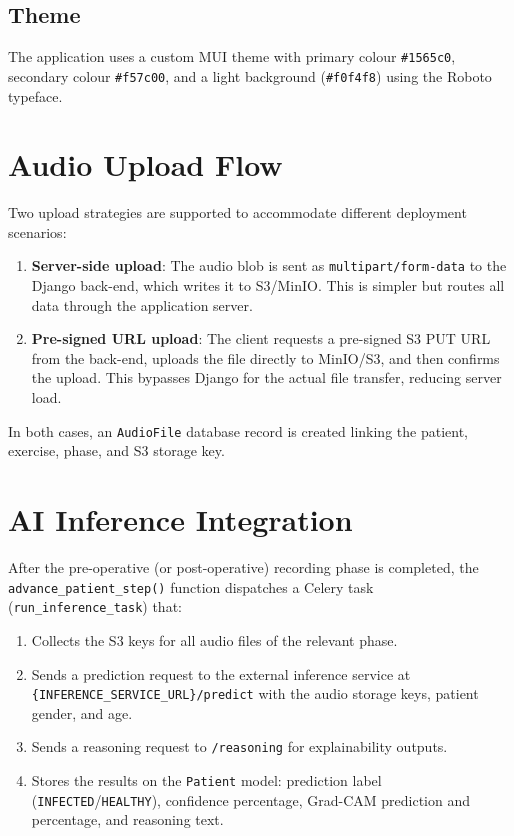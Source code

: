 \documentclass[12pt,a4paper]{article}
\begin{document}
\subsection{Theme}

The application uses a custom MUI theme with primary colour
\texttt{\#1565c0}, secondary colour \texttt{\#f57c00}, and a light background
(\texttt{\#f0f4f8}) using the Roboto typeface.

\section{Audio Upload Flow}
\label{sec:audio-upload}

Two upload strategies are supported to accommodate different deployment
scenarios:

\begin{enumerate}[nosep]
  \item \textbf{Server-side upload}: The audio blob is sent as
    \texttt{multipart/form-data} to the Django back-end, which writes it to
    S3/MinIO. This is simpler but routes all data through the application
    server.
  \item \textbf{Pre-signed URL upload}: The client requests a pre-signed S3 PUT
    URL from the back-end, uploads the file directly to MinIO/S3, and then
    confirms the upload. This bypasses Django for the actual file transfer,
    reducing server load.
\end{enumerate}

In both cases, an \texttt{AudioFile} database record is created linking the
patient, exercise, phase, and S3 storage key.

\section{AI Inference Integration}
\label{sec:inference}

After the pre-operative (or post-operative) recording phase is completed, the
\texttt{advance\_patient\_step()} function dispatches a Celery task
(\texttt{run\_inference\_task}) that:

\begin{enumerate}[nosep]
  \item Collects the S3 keys for all audio files of the relevant phase.
  \item Sends a prediction request to the external inference service at
    \texttt{\{INFERENCE\_SERVICE\_URL\}/predict} with the audio storage keys,
    patient gender, and age.
  \item Sends a reasoning request to \texttt{/reasoning} for explainability
    outputs.
  \item Stores the results on the \texttt{Patient} model: prediction label
    (\texttt{INFECTED}/\texttt{HEALTHY}), confidence percentage, Grad-CAM
    prediction and percentage, and reasoning text.
\end{enumerate}
\end{document}
